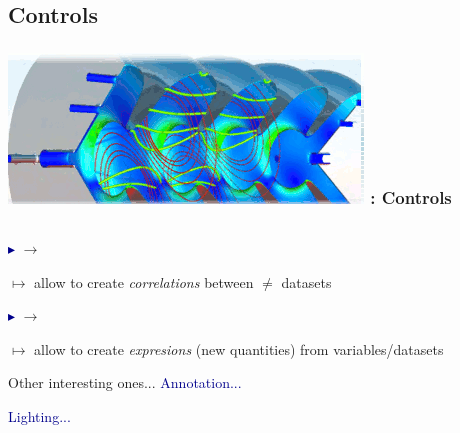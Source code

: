 \subsection{Controls}
\begin{frame}
\frametitle{\href{https://wci.llnl.gov/simulation/computer-codes/visit/}{\includegraphics[height=.85cm]{figs/visit-logos/VisIt-02}} \hspace{-.85cm}{\bf \textcolor{DarkOrange}{VisIt}}: Controls}

\begin{columns}
\begin{column}{6.5cm}
	\textcolor{DarkBlue}{$\blacktriangleright$}
	 $\rightarrow$ 

	\hspace{5mm} $\mapsto$ allow to create \textit{correlations} between $\neq$ datasets

	\pause
	\vspace{3.5mm}
	\textcolor{DarkBlue}{$\blacktriangleright$}
	 $\rightarrow$ 

	\hspace{5mm} $\mapsto$ allow to create \textit{expresions} (new quantities) from variables/datasets

	\pause
	\vspace{3.5mm}
	\begin{beamerboxesrounded}[upper=block head,lower=block body,shadow=true]{ Other interesting ones...}
		\hspace{2mm}
		 \textcolor{DarkBlue}{Annotation...}

				\hspace{2mm}
		 \textcolor{DarkBlue}{Lighting...}


\end{beamerboxesrounded}
\end{column}
\end{columns}
\end{frame}
